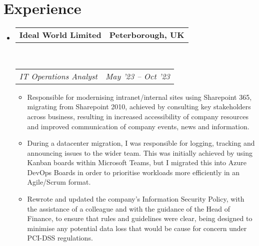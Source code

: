 \documentclass[10pt,a4paper]{article}
\makeatletter
\newcommand{\headerrow}[2]
{\begin{tabular*}{\linewidth}{l@{\extracolsep{\fill}}r}
	#1 &
	#2 \\
\end{tabular*}}
\makeatother
\begin{document}
\section{Experience}
\begin{itemize}
	\parskip=0.1em

	\item
	\headerrow
		{\textbf{Ideal World Limited}}
		{\textbf{Peterborough, UK}}
	\\
	\headerrow
		{\emph{IT Operations Analyst}}
		{\emph{May '23 -- Oct '23}}
	\begin{itemize}
		\item Responsible for modernising intranet/internal sites using Sharepoint 365, migrating from Sharepoint 2010, achieved by consulting key stakeholders across business, resulting in increased accessibility of company resources and improved communication of company events, news and information.
		\item During a datacenter migration, I was responsible for logging, tracking and announcing issues to the wider team. This was initially achieved by using Kanban boards within Microsoft Teams, but I migrated this into Azure DevOps Boards in order to prioritise workloads more efficiently in an Agile/Scrum format.
		\item Rewrote and updated the company's Information Security Policy, with the assistance of a colleague and with the guidance of the Head of Finance, to ensure that rules and guidelines were clear, being designed to minimise any potential data loss that would be cause for concern under PCI-DSS regulations.
	\end{itemize}


\end{itemize}
\end{document}
